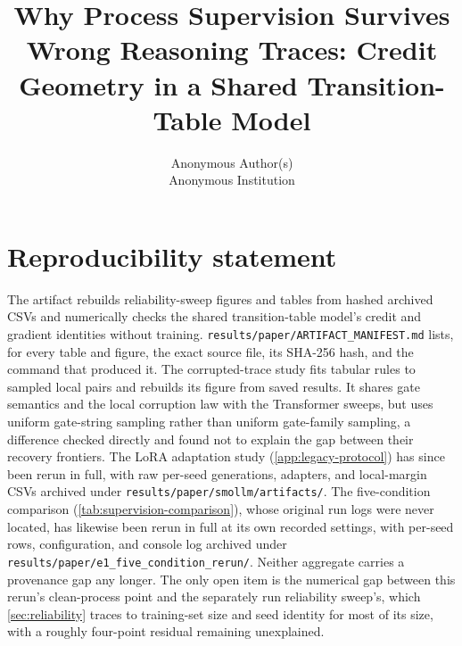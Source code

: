 \documentclass{article}
\title{Why Process Supervision Survives Wrong Reasoning Traces: Credit Geometry in a Shared Transition-Table Model}
\author{%
    Anonymous Author(s)\\
    Anonymous Institution
}
\begin{document}
\maketitle
\raggedbottom


\section*{Reproducibility statement}
The artifact rebuilds reliability-sweep figures and tables from hashed archived
CSVs and numerically checks the shared transition-table model's credit and gradient identities
without training. \texttt{results/paper/ARTIFACT\_MANIFEST.md} lists, for every
table and figure, the exact source file, its SHA-256 hash, and the command
that produced it. The corrupted-trace study fits tabular rules to sampled
local pairs and rebuilds its figure from saved results. It shares gate
semantics and the local corruption law with the Transformer sweeps, but uses
uniform gate-string sampling rather than uniform gate-family sampling, a
difference checked directly and found not to explain the gap between their
recovery frontiers. The LoRA adaptation study (\cref{app:legacy-protocol})
has since been rerun in full, with raw per-seed generations, adapters, and
local-margin CSVs archived under \texttt{results/paper/smollm/artifacts/}.
The five-condition comparison (\cref{tab:supervision-comparison}), whose
original run logs were never located, has likewise been rerun in full at
its own recorded settings, with per-seed rows, configuration, and console
log archived under \texttt{results/paper/e1\_five\_condition\_rerun/}.
Neither aggregate carries a provenance gap any longer. The only open item
is the numerical gap between this rerun's clean-process point and the
separately run reliability sweep's, which \cref{sec:reliability} traces
to training-set size and seed identity for most of its size, with a
roughly four-point residual remaining unexplained.




\end{document}
